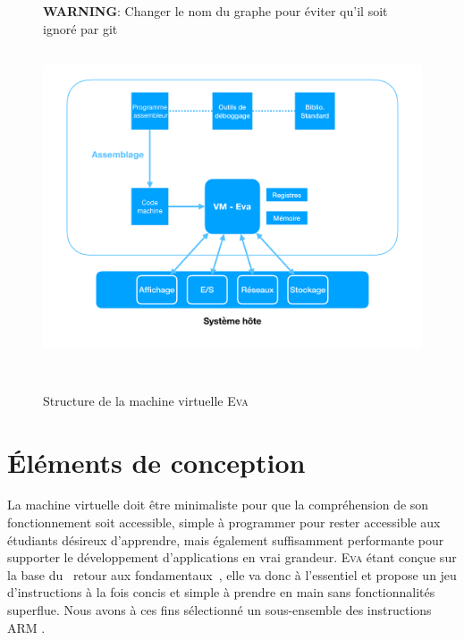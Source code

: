 \documentclass[11pt,twoside,french]{article}
\makeatletter
\providecommand{\og}{\leavevmode\flqq~}%
\providecommand{\fg}{\ifdim\lastskip>\z@\unskip\fi~\frqq}%
\newcommand{\noun}[1]{\textsc{#1}}
\makeatother
\begin{document}
\begin{figure}[b]
  \centering
  \textbf{WARNING}: Changer le nom du graphe pour éviter qu'il soit ignoré par git
  \includegraphics[height=10cm, keepaspectratio]{diagram1_graph.pdf}
  \caption{Structure de la machine virtuelle \noun{Eva}}
  \label{fig:diagram1}
\end{figure}

\section{Éléments de conception}

La machine virtuelle doit être minimaliste pour que la compréhension de son fonctionnement soit accessible, simple à programmer pour rester accessible aux étudiants désireux d'apprendre, mais également suffisamment performante pour supporter le développement d'applications en vrai grandeur. \noun{Eva} étant conçue sur la base du \og retour aux fondamentaux\fg , elle va donc à l'essentiel et propose un jeu d'instructions à la fois concis et simple à prendre en main sans fonctionnalités superflue. Nous avons à ces fins sélectionné un sous-ensemble des instructions ARM .
\end{document}
